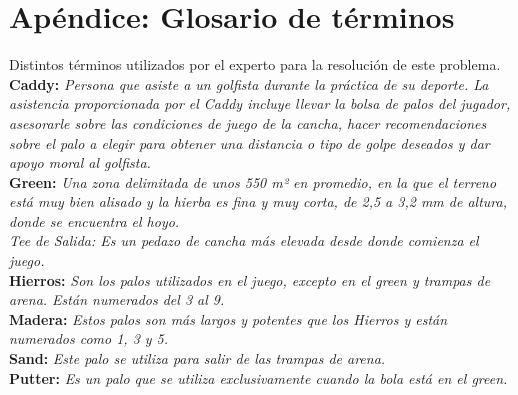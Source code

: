\documentclass[runningheads,a4paper]{llncs}
\begin{document}
\section*{Apéndice: Glosario de términos}
Distintos términos utilizados por el experto para la resolución de este problema.\\
\textbf{Caddy:} \textit{Persona que asiste a un golfista durante la práctica de su deporte. La asistencia proporcionada por el Caddy incluye llevar la bolsa de palos del jugador, asesorarle sobre las condiciones de juego de la cancha, hacer recomendaciones sobre el palo a elegir para obtener una distancia o tipo de golpe deseados y dar apoyo moral al golfista.}\\
\textbf{Green:}  \textit{Una zona delimitada de unos 550 m² en promedio, en la que el terreno está muy bien alisado y la hierba es fina y muy corta, de 2,5 a 3,2 mm de altura, donde se encuentra el hoyo.\\
Tee de Salida: Es un pedazo de cancha más elevada desde donde comienza el juego.}\\
\textbf{Hierros:} \textit{Son los palos utilizados en el juego, excepto en el green y trampas de arena. Están numerados del 3 al 9.}\\
\textbf{Madera:} \textit{Estos palos son más largos y potentes que los Hierros y están numerados como 1, 3 y 5.}\\
\textbf{Sand:} \textit{Este palo se utiliza para salir de las trampas de arena.}\\
\textbf{Putter:} \textit{Es un palo que se utiliza exclusivamente cuando la bola está en el green.}
\end{document}
